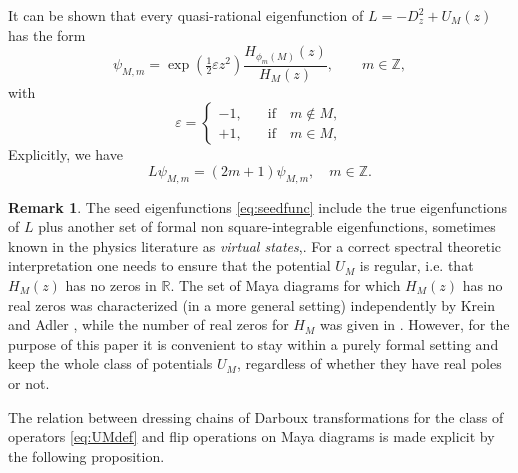 \documentclass[10pt]{amsart}
\theoremstyle{definition}
\newtheorem{remark}[thm]{Remark}
\numberwithin{equation}{section}
\numberwithin{figure}{section}
\newcommand{\Z}{\mathbb{Z}}
\newcommand{\R}{\mathbb{R}}
\renewcommand{\H}{H}%
\newcommand{\cL}{L}%
\newcommand{\ep}{\varepsilon}
\begin{document}
It can be shown that every quasi-rational eigenfunction
\cite{gomez2004supersymmetry,gomez2004darboux} of $ \cL=-D_z^2+ U_M(z)$
has the form
\begin{equation}
  \label{eq:seedfunc}
  \psi_{M,m} = \exp(\tfrac12\ep z^2)\frac{\H_{\phi_m(M)}(z)}{\H_M(z)}, \qquad m\in \Z,
\end{equation}
with 
\[ \ep = \begin{cases}
  -1, & \text{if}\quad m\notin M, \\
  +1,\quad & \text{if}\quad m\in M,
\end{cases} 
\]
Explicitly, we have
\begin{equation}
    \label{eq:Mneigenfunc}
    \cL \psi_{M,m}  = (2m+1) \psi_{M,m} ,\quad m\in \Z.    
  \end{equation}

\begin{remark}
The seed eigenfunctions \eqref{eq:seedfunc} include the true eigenfunctions of $\cL$ plus another set of formal non square-integrable eigenfunctions, sometimes known in the physics literature as \textit{virtual states},\cite{odake2013krein,odake2011exactly}. For a correct spectral theoretic interpretation one needs to ensure that the potential $U_M$ is regular, i.e. that $\H_M(z)$ has no zeros in $\R$. The set of Maya diagrams for which $\H_M(z)$ has no real zeros was characterized (in a more general setting) independently by Krein \cite{krein1957continuous} and Adler \cite{adler1994modification}, while the number of real zeros for $\H_M$ was given in \cite{garcia2015oscillation}. However, for the purpose of this paper it is convenient to stay within a purely formal setting and keep the whole class of potentials $U_M$, regardless of whether they have real poles or not.
\end{remark}

The relation between dressing chains of Darboux transformations for the class of operators \eqref{eq:UMdef} and flip operations on Maya diagrams is made explicit by the following proposition. 
\end{document}
